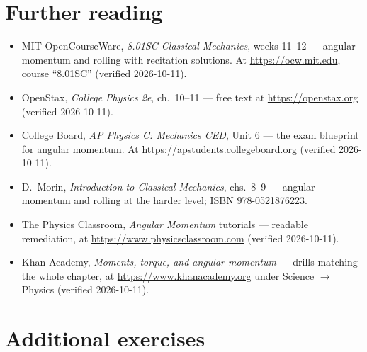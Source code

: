 \section*{Further reading}

\begin{itemize}
\item MIT OpenCourseWare, \emph{8.01SC Classical Mechanics}, weeks 11--12
--- angular momentum and rolling with recitation solutions. At
\url{https://ocw.mit.edu}, course ``8.01SC'' (verified 2026-10-11).
\item OpenStax, \emph{College Physics 2e}, ch.~10--11 --- free text at
\url{https://openstax.org} (verified 2026-10-11).
\item College Board, \emph{AP Physics C: Mechanics CED}, Unit 6 --- the
exam blueprint for angular momentum. At
\url{https://apstudents.collegeboard.org} (verified 2026-10-11).
\item D.~Morin, \emph{Introduction to Classical Mechanics}, chs.~8--9 ---
angular momentum and rolling at the harder level; ISBN 978-0521876223.
\item The Physics Classroom, \emph{Angular Momentum} tutorials --- readable
remediation, at \url{https://www.physicsclassroom.com} (verified
2026-10-11).
\item Khan Academy, \emph{Moments, torque, and angular momentum} ---
drills matching the whole chapter, at \url{https://www.khanacademy.org}
under Science $\to$ Physics (verified 2026-10-11).
\end{itemize}

\section*{Additional exercises}

